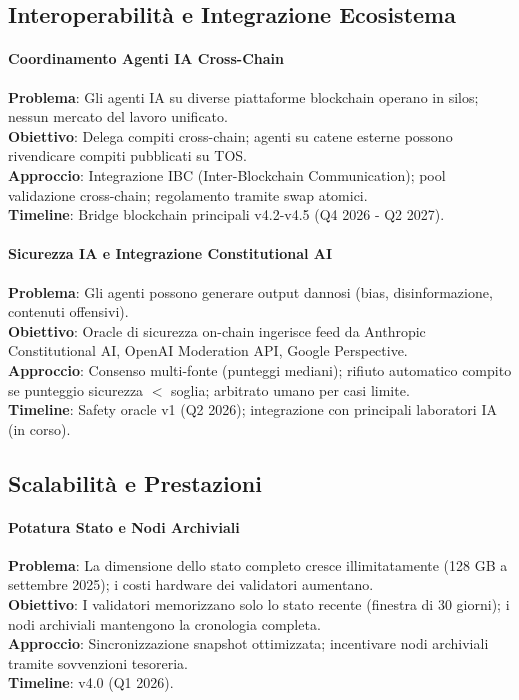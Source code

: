 \documentclass[11pt]{article}
\begin{document}
\begin{itemize}[noitemsep]
\subsection{Interoperabilità e Integrazione Ecosistema}

\paragraph{Coordinamento Agenti IA Cross-Chain}
\textbf{Problema}: Gli agenti IA su diverse piattaforme blockchain operano in silos; nessun mercato del lavoro unificato.\\
\textbf{Obiettivo}: Delega compiti cross-chain; agenti su catene esterne possono rivendicare compiti pubblicati su TOS.\\
\textbf{Approccio}: Integrazione IBC (Inter-Blockchain Communication); pool validazione cross-chain; regolamento tramite swap atomici.\\
\textbf{Timeline}: Bridge blockchain principali v4.2-v4.5 (Q4 2026 - Q2 2027).

\paragraph{Sicurezza IA e Integrazione Constitutional AI}
\textbf{Problema}: Gli agenti possono generare output dannosi (bias, disinformazione, contenuti offensivi).\\
\textbf{Obiettivo}: Oracle di sicurezza on-chain ingerisce feed da Anthropic Constitutional AI, OpenAI Moderation API, Google Perspective.\\
\textbf{Approccio}: Consenso multi-fonte (punteggi mediani); rifiuto automatico compito se punteggio sicurezza $<$ soglia; arbitrato umano per casi limite.\\
\textbf{Timeline}: Safety oracle v1 (Q2 2026); integrazione con principali laboratori IA (in corso).

\subsection{Scalabilità e Prestazioni}

\paragraph{Potatura Stato e Nodi Archiviali}
\textbf{Problema}: La dimensione dello stato completo cresce illimitatamente (128 GB a settembre 2025); i costi hardware dei validatori aumentano.\\
\textbf{Obiettivo}: I validatori memorizzano solo lo stato recente (finestra di 30 giorni); i nodi archiviali mantengono la cronologia completa.\\
\textbf{Approccio}: Sincronizzazione snapshot ottimizzata; incentivare nodi archiviali tramite sovvenzioni tesoreria.\\
\textbf{Timeline}: v4.0 (Q1 2026).


\end{itemize}
\end{document}

